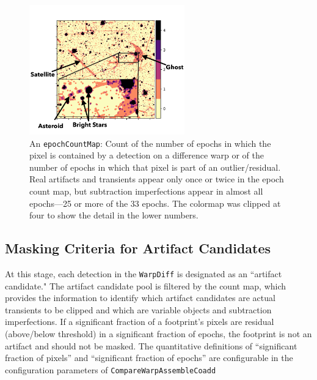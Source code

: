 \documentclass[DM,authoryear,toc]{lsstdoc}
\begin{document}
\begin{figure}
\begin{centering}
\includegraphics[width=0.6\textwidth]{figures/AnnotatedEpochCountImage.pdf}
\par\end{centering}
\caption{\label{fig:countMap} An \texttt{epochCountMap}:  Count of the number of epochs in which the  pixel is contained by a detection on a difference warp or of the number of epochs in which that pixel is part of an outlier/residual.  Real artifacts and transients appear only once or twice in the epoch count map, but subtraction imperfections appear in almost all epochs---25 or more of the 33 epochs.  The colormap was clipped at four to show the detail in the lower numbers. }
\end{figure}

\subsection{Masking Criteria for Artifact Candidates}
\label{sec:criteria}

At this stage, each detection in the \texttt{WarpDiff} is designated as an ``artifact candidate."
The artifact candidate pool is filtered by the count map, which provides the information to identify which artifact candidates are actual transients to be clipped and which are variable objects and subtraction imperfections.
If a significant fraction of a footprint's pixels are residual (above/below threshold) in a significant fraction of epochs, the footprint is not an artifact and should not be masked.
The quantitative definitions of ``significant fraction of pixels'' and ``significant fraction of epochs'' are configurable in the configuration parameters of \texttt{CompareWarpAssembleCoadd}
\end{document}
